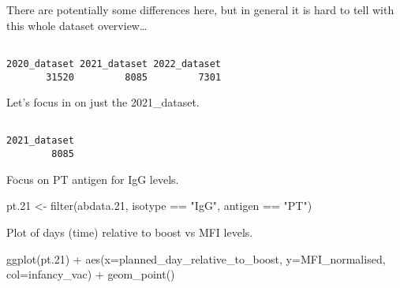 \documentclass[
  letterpaper,
  DIV=11,
  numbers=noendperiod]{scrartcl}
\newenvironment{Shaded}{\begin{snugshade}}{\end{snugshade}}
\newcommand{\AttributeTok}[1]{\textcolor[rgb]{0.40,0.45,0.13}{#1}}
\newcommand{\FloatTok}[1]{\textcolor[rgb]{0.68,0.00,0.00}{#1}}
\newcommand{\FunctionTok}[1]{\textcolor[rgb]{0.28,0.35,0.67}{#1}}
\newcommand{\NormalTok}[1]{\textcolor[rgb]{0.00,0.23,0.31}{#1}}
\newcommand{\OtherTok}[1]{\textcolor[rgb]{0.00,0.23,0.31}{#1}}
\newcommand{\SpecialCharTok}[1]{\textcolor[rgb]{0.37,0.37,0.37}{#1}}
\newcommand{\StringTok}[1]{\textcolor[rgb]{0.13,0.47,0.30}{#1}}
\begin{document}
There are potentially some differences here, but in general it is hard
to tell with this whole dataset overview\ldots{}

\begin{Shaded}
\end{Shaded}

\begin{verbatim}

2020_dataset 2021_dataset 2022_dataset 
       31520         8085         7301 
\end{verbatim}

Let's focus in on just the 2021\_dataset.

\begin{Shaded}
\end{Shaded}

\begin{verbatim}

2021_dataset 
        8085 
\end{verbatim}

Focus on PT antigen for IgG levels.

\begin{Shaded}
\begin{Highlighting}[]
\NormalTok{pt}\FloatTok{.21} \OtherTok{\textless{}{-}} \FunctionTok{filter}\NormalTok{(abdata}\FloatTok{.21}\NormalTok{, isotype }\SpecialCharTok{==} \StringTok{"IgG"}\NormalTok{, antigen }\SpecialCharTok{==} \StringTok{"PT"}\NormalTok{)}
\end{Highlighting}
\end{Shaded}

Plot of days (time) relative to boost vs MFI levels.

\begin{Shaded}
\begin{Highlighting}[]
\FunctionTok{ggplot}\NormalTok{(pt}\FloatTok{.21}\NormalTok{) }\SpecialCharTok{+}
  \FunctionTok{aes}\NormalTok{(}\AttributeTok{x=}\NormalTok{planned\_day\_relative\_to\_boost,}
        \AttributeTok{y=}\NormalTok{MFI\_normalised,}
        \AttributeTok{col=}\NormalTok{infancy\_vac) }\SpecialCharTok{+}
  \FunctionTok{geom\_point}\NormalTok{()}
\end{Highlighting}
\end{Shaded}
\end{document}
